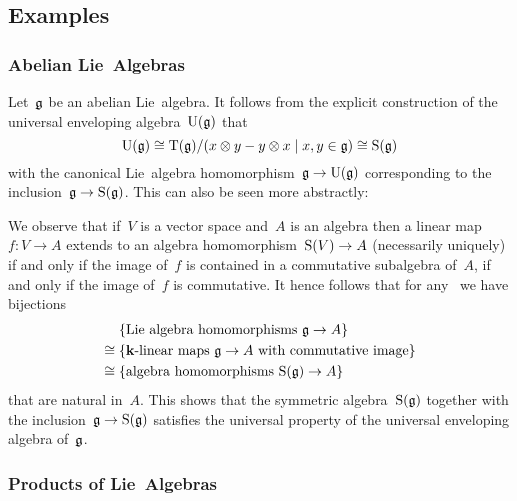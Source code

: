 \subsection{Examples}



\subsubsection{Abelian Lie~Algebras}


\begin{examples}
  Let~$\mathfrak{g}$ be an abelian Lie~algebra.
  It follows from the explicit construction of the universal enveloping algebra~$\operatorname{U}(\mathfrak{g})$ that
  \[
    \Univ(\glie)
    \cong
    \Tensor(\glie)/(x \tensor y - y \tensor x \suchthat x, y \in \glie)
    \cong
    \Symm(\glie)
  \]
  with the canonical Lie~algebra homomorphism~$\mathfrak{g} \to \operatorname{U}(\mathfrak{g})$ corresponding to the inclusion~$\mathfrak{g} \to \operatorname{S}(\mathfrak{g})$.
  This can also be seen more abstractly:
  
  We observe that if~$V$ is a vector space and~$A$ is an algebra then a linear map~$f \colon V \to A$ extends to an algebra homomorphism~$\operatorname{S}(V) \to A$ (necessarily uniquely) if and only if the image of~$f$ is contained in a commutative subalgebra of~$A$, if and only if the image of~$f$ is commutative.
  It hence follows that for any~{\algebra{$\kf$}} we have bijections
  \begin{align*}
    {}&
    \{ \text{Lie~algebra homomorphisms~$\glie \to A$} \}
    \\
    \cong{}&
    \{ \text{{\linear{$\kf$}} maps~$\glie \to A$ with commutative image} \}
    \\
    \cong{}&
    \{ \text{algebra homomorphisms~$\Symm(\glie) \to A$} \}
  \end{align*}
  that are natural in~$A$.
  This shows that the symmetric algebra~$\operatorname{S}(\mathfrak{g})$ together with the inclusion~$\mathfrak{g} \to \operatorname{S}(\mathfrak{g})$ satisfies the universal property of the universal enveloping algebra of~$\mathfrak{g}$.
\end{examples}



\subsubsection{Products of Lie~Algebras}


